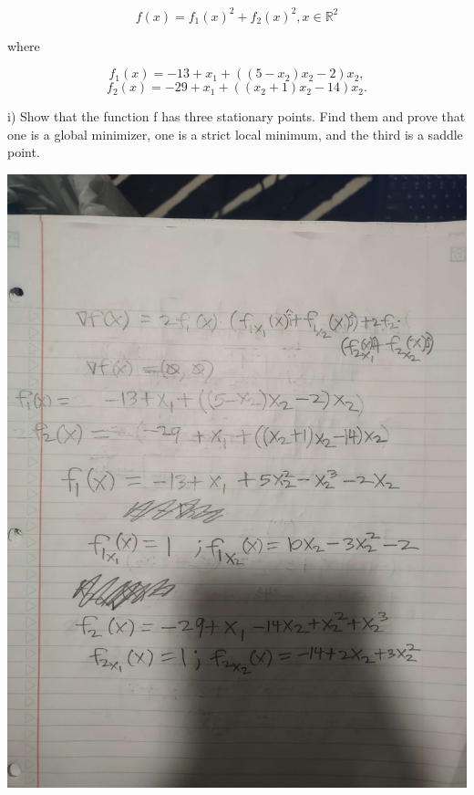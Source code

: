 \documentclass{article}
\newcommand{\RR}{\mathbb{R}}
\begin{document}
\[f(x) = f_1(x)^2 + f_2(x)^2, x \in \RR^2\]

where

\[f_1(x) = -13 + x_1 + ((5-x_2)x_2 - 2)x_2,\]
\[f_2(x) = -29 + x_1 + ((x_2 + 1)x_2 - 14)x_2.\]

i) Show that the function f has three stationary points. Find them and prove that
one is a global minimizer, one is a strict local minimum, and the third is a saddle point.


\includegraphics[scale=0.1]{problem_5_1}
\end{document}
